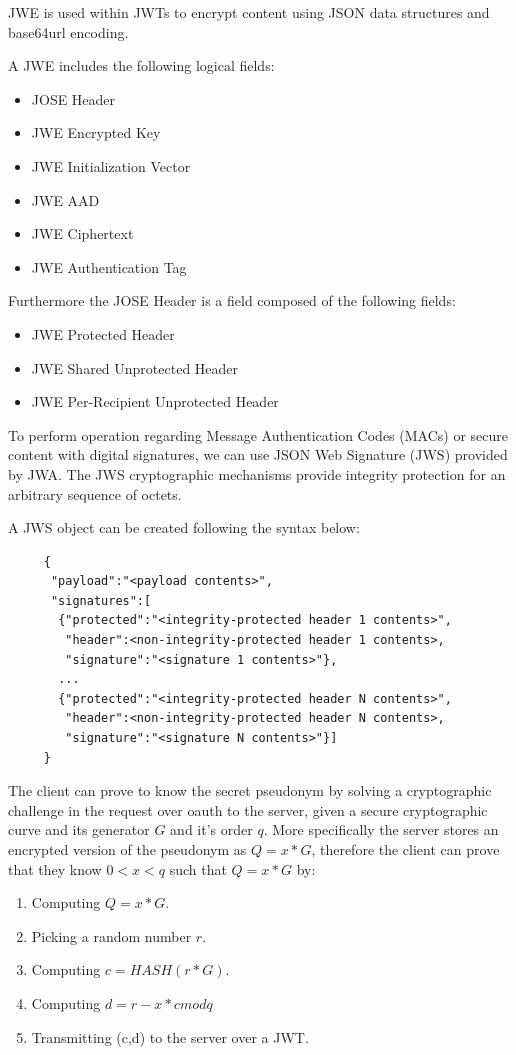 JWE is used within JWTs to encrypt content using JSON data structures and base64url encoding.

A JWE includes the following logical fields:
\begin{itemize}
    \item JOSE Header
    \item JWE Encrypted Key
    \item JWE Initialization Vector
    \item JWE AAD
    \item JWE Ciphertext
    \item JWE Authentication Tag
\end{itemize}

Furthermore the JOSE Header is a field composed of the following fields:
\begin{itemize}
    \item JWE Protected Header
    \item JWE Shared Unprotected Header
    \item JWE Per-Recipient Unprotected Header
\end{itemize}

To perform operation regarding Message Authentication Codes (MACs) or secure content with digital signatures, we can use JSON Web Signature (JWS) provided by JWA. The JWS cryptographic mechanisms provide integrity protection for an arbitrary sequence of octets.  

A JWS object can be created following the syntax below:
\begin{lstlisting}
     {
      "payload":"<payload contents>",
      "signatures":[
       {"protected":"<integrity-protected header 1 contents>",
        "header":<non-integrity-protected header 1 contents>,
        "signature":"<signature 1 contents>"},
       ...
       {"protected":"<integrity-protected header N contents>",
        "header":<non-integrity-protected header N contents>,
        "signature":"<signature N contents>"}]
     }

\end{lstlisting}

The client can prove to know the secret pseudonym by solving a cryptographic challenge in the request over oauth to the server, given a secure cryptographic curve and its generator $G$ and it's order $q$. More specifically the server stores an encrypted version of the pseudonym as $Q = x * G$, therefore the client can prove that they know $0 < x < q$ such that $Q = x * G$ by:
\begin{enumerate}
    \item Computing $Q = x * G$.
    \item Picking a random number $r$.
    \item Computing $c = HASH(r * G)$.
    \item Computing $d = r - x*c mod q$
    \item Transmitting (c,d) to the server over a JWT.
\end{enumerate}

